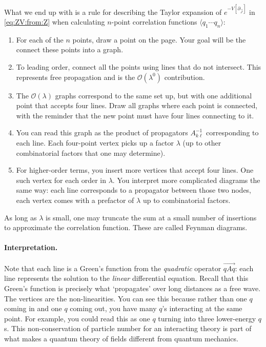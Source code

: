 What we end up with is a rule for describing the Taylor expansion of $e^{-V[\partial_{\vec{J}}]}$ in \eqref{eq:ZV:from:Z} when calculating $n$-point correlation functions $\langle q_1\cdots q_n\rangle$:
\begin{enumerate}
\item For each of the $n$ points, draw a point on the page. Your goal will be the connect these points into a graph.

\item To leading order, connect all the points using lines that do not intersect. This represents free propagation and is the $\mathcal O(\lambda^0)$ contribution.

\item The $\mathcal O(\lambda)$ graphs correspond to the same set up, but with one additional point that accepts four lines. Draw all graphs where each point is connected, with the reminder that the new point must have four lines connecting to it.

\item You can read this graph as the product of propagators $A^{-1}_{k\ell}$ corresponding to each line. Each four-point vertex picks up a factor $\lambda$ (up to other combinatorial factors that one may determine).

\item For higher-order terms, you insert more vertices that accept four lines. One such vertex for each order in $\lambda$. You interpret more complicated diagrams the same way: each line corresponds to a propagator between those two nodes, each vertex comes with a prefactor of $\lambda$ up to combinatorial factors.
\end{enumerate}
As long as $\lambda$ is small, one may truncate the sum at a small number of insertions to approximate the correlation function. These are called Feynman diagrams.

\paragraph{Interpretation.}
Note that each line is a Green's function from the \emph{quadratic} operator $\vec{qAq}$: each line represents the solution to the \emph{linear} differential equation. Recall that this Green's function is precisely what `propagates' over long distances as a free wave. The vertices are the non-linearities. You can see this because rather than one $q$ coming in and one $q$ coming out, you have many $q$'s interacting at the same point. For example, you could read this as one $q$ turning into three lower-energy $q$s. This non-conservation of particle number for an interacting theory is part of what makes a quantum theory of fields different from quantum mechanics. 

